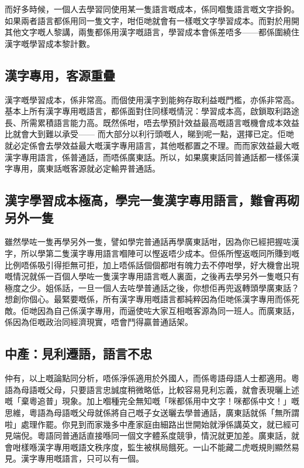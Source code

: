 \documentclass[a5paper, 12pt, openany]{book} %
\begin{document}
而好多時候，一個人去學習同使用某一隻語言嘅成本，係同嗰隻語言嘅文字掛鉤。如果兩者語言都係用同一隻文字，咁佢哋就會有一樣嘅文字學習成本。而對於用開其他文字嘅人黎講，兩隻都係用漢字嘅語言，學習成本會係差唔多——都係圍繞住漢字嘅學習成本黎計數。

\subsection*{漢字專用，客源重疊}

漢字嘅學習成本，係非常高。而個使用漢字到能夠存取利益嘅門檻，亦係非常高。基本上所有漢字專用嘅語言，都係面對住同樣嘅情況：學習成本高，啟鎖取利路途長、所需累積語言能力高。既然係咁，唔去學預計效益最高嘅語言嘅機會成本效益比就會大到難以承受—— 而大部分以利行頭嘅人，睇到呢一點，選擇已定。佢哋就必定係會去學效益最大嘅漢字專用語言，其他嘅都置之不理。而而家效益最大嘅漢字專用語言，係普通話，而唔係廣東話。所以，如果廣東話同普通話都一樣係漢字專用，廣東話嘅客源就必定輸畀普通話。

\subsection*{漢字學習成本極高，學完一隻漢字專用語言，難會再砌另外一隻}
雖然學咗一隻再學另外一隻，譬如學完普通話再學廣東話咁，因為你已經把握咗漢字，所以學第二隻漢字專用語言嗰陣可以慳返唔少成本。但係所慳返嘅同所賺到嘅比例唔係吸引得拒無可拒，加上唔係話個個都咁有魄力去不停咁學，好大機會出現嘅情況就係一百個人學咗一隻漢字專用語言嘅人裏面，之後再去學另外一隻嘅只有極度之少。姐係話，一旦一個人去咗學普通話之後，你想佢再兜返轉頭學廣東話？想創你個心。最緊要嘅係，所有漢字專用嘅語言都純粹因為佢哋係漢字專用而係死敵。佢哋因為自己係漢字專用，而逼使咗大家互相嘅客源為同一班人。而廣東話，係因為佢嘅政治同經濟現實，唔會鬥得贏普通話架。

\subsection*{中產：見利遷語，語言不忠}
仲有，以上嘅論點同分析，唔係淨係適用於外國人，而係粵語母語人士都適用。粵語為母語嘅父母，只要語言忠誠度稍微略低，比較容易見利忘義，就會表現曬上述嘅「棄粵追普」現象。加上嗰種完全無知嘅「咪都係用中文字！咪都係中文！」嘅思維，粵語為母語嘅父母就係將自己嘅子女送曬去學普通話，廣東話就係「無所謂啦」處理作罷。你見到而家幾多中產家庭由細路出世開始就淨係講英文，就已經可見端倪。粵語同普通話直接喺同一個文字體系度競爭，情況就更加差。廣東話，就會咁樣喺漢字專用嘅語文秩序度，監生被棋局餓死。一山不能藏二虎嘅規則顯然易見。漢字專用嘅語言，只可以有一個。
\end{document}
